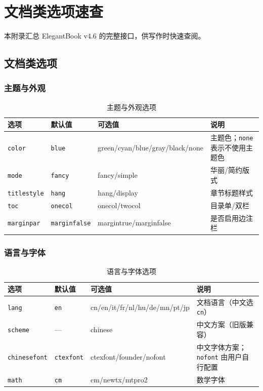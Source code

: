 
\chapter{文档类选项速查}

本附录汇总 ElegantBook v4.6 的完整接口，供写作时快速查阅。

\section{文档类选项}

\subsection{主题与外观}

\begin{table}[htbp]
  \centering
  \caption{主题与外观选项}\label{tab:opt-look}
  \begin{tabular}{lllp{5.5cm}}
    \toprule
    选项 & 默认值 & 可选值 & 说明 \\
    \midrule
    \texttt{color} & \texttt{blue} & green/cyan/blue/gray/black/none &
      主题色；\texttt{none} 表示不使用主题色 \\
    \texttt{mode} & \texttt{fancy} & fancy/simple & 华丽/简约版式 \\
    \texttt{titlestyle} & \texttt{hang} & hang/display & 章节标题样式 \\
    \texttt{toc} & \texttt{onecol} & onecol/twocol & 目录单/双栏 \\
    \texttt{marginpar} & \texttt{marginfalse} & margintrue/marginfalse &
      是否启用边注栏 \\
    \bottomrule
  \end{tabular}
\end{table}

\subsection{语言与字体}

\begin{table}[htbp]
  \centering
  \caption{语言与字体选项}\label{tab:opt-lang}
  \begin{tabular}{lllp{5.5cm}}
    \toprule
    选项 & 默认值 & 可选值 & 说明 \\
    \midrule
    \texttt{lang} & \texttt{en} & cn/en/it/fr/nl/hu/de/mn/pt/jp &
      文档语言（中文选 \texttt{cn}）\\
    \texttt{scheme} & --- & chinese & 中文方案（旧版兼容）\\
    \texttt{chinesefont} & \texttt{ctexfont} & ctexfont/founder/nofont &
      中文字体方案；\texttt{nofont} 由用户自行配置 \\
    \texttt{math} & \texttt{cm} & cm/newtx/mtpro2 & 数学字体 \\
    \bottomrule
  \end{tabular}
\end{table}

